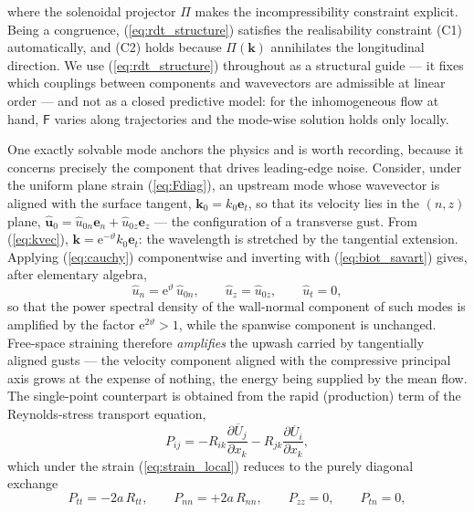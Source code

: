 \documentclass[lineno]{JFM-FLM_Au}
\begin{document}
where the solenoidal projector $\Pi$ makes the incompressibility
constraint explicit. Being a congruence, (\ref{eq:rdt_structure})
satisfies the realisability constraint (C1) automatically, and (C2) holds
because $\Pi(\boldsymbol{k})$ annihilates the longitudinal direction. We
use (\ref{eq:rdt_structure}) throughout as a structural guide --- it fixes
which couplings between components and wavevectors are admissible at
linear order --- and not as a closed predictive model: for the
inhomogeneous flow at hand, $\mathsf{F}$ varies along trajectories and the
mode-wise solution holds only locally.

One exactly solvable mode anchors the physics and is worth recording,
because it concerns precisely the component that drives leading-edge
noise. Consider, under the uniform plane strain (\ref{eq:Fdiag}), an
upstream mode whose wavevector is aligned with the surface tangent,
$\boldsymbol{k}_0 = k_0\boldsymbol{e}_t$, so that its velocity lies in the
$(n,z)$ plane,
$\hat{\boldsymbol{u}}_0 = \hat{u}_{0n}\boldsymbol{e}_n
+ \hat{u}_{0z}\boldsymbol{e}_z$ --- the configuration of a transverse
gust. From (\ref{eq:kvec}),
$\boldsymbol{k} = \mathrm{e}^{-\vartheta}k_0\boldsymbol{e}_t$: the
wavelength is stretched by the tangential extension. Applying
(\ref{eq:cauchy}) componentwise and inverting with
(\ref{eq:biot_savart}) gives, after elementary algebra,
\begin{equation}
  \hat{u}_n = \mathrm{e}^{\vartheta}\,\hat{u}_{0n},
  \qquad
  \hat{u}_z = \hat{u}_{0z},
  \qquad
  \hat{u}_t = 0,
  \label{eq:worked_mode}
\end{equation}
so that the power spectral density of the wall-normal component of such
modes is amplified by the factor $\mathrm{e}^{2\vartheta} > 1$, while the
spanwise component is unchanged. Free-space straining therefore
\emph{amplifies} the upwash carried by tangentially aligned gusts ---
the velocity component aligned with the compressive principal axis grows
at the expense of nothing, the energy being supplied by the mean flow.
The single-point counterpart is obtained from the rapid (production) term
of the Reynolds-stress transport equation,
\begin{equation}
  P_{ij}
  = -R_{ik}\frac{\partial\overline{U}_j}{\partial x_k}
    -R_{jk}\frac{\partial\overline{U}_i}{\partial x_k},
  \label{eq:production}
\end{equation}
which under the strain (\ref{eq:strain_local}) reduces to the purely
diagonal exchange
\begin{equation}
  P_{tt} = -2a\,R_{tt},
  \qquad
  P_{nn} = +2a\,R_{nn},
  \qquad
  P_{zz} = 0,
  \qquad
  P_{tn} = 0,
  \label{eq:production_local}
\end{equation}
\end{document}

